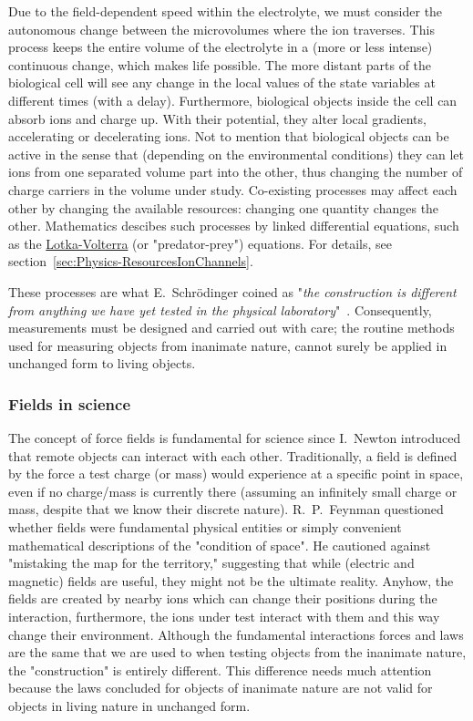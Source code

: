 Due to the 
field-dependent speed within the electrolyte, we must consider the autonomous
change between the microvolumes where the ion traverses. 
This process keeps the entire volume of the electrolyte in a (more or less intense) continuous change, which makes life possible.
The more distant parts of the biological cell will see any change in the local values of the state variables at different times (with a delay). 
Furthermore, biological objects inside the cell
can absorb ions and charge up. With their potential, they alter local gradients, accelerating or decelerating ions.  
Not to mention that biological objects can be active in the sense that 
(depending on the environmental conditions) they can let ions from one separated volume part into the other, thus changing the number of 
charge carriers in the volume under study.
Co-existing processes may affect each other by \hypertarget{ChangingResources}{changing the available resources}:
changing one quantity changes the other.
Mathematics descibes such processes by linked differential equations, such as the \href{https://en.wikipedia.org/wiki/Lotka-Volterra_equations}{Lotka-Volterra} (or \hypertarget{predator_prey}{"predator-prey"}) equations.
For details, see section~\ref{sec:Physics-ResourcesIonChannels}.


These processes are what E.~Schrödinger coined as "\textit{the construction is different from anything we have yet tested in the physical laboratory}"~\cite{Schrodinger:1992}. Consequently, measurements must be designed and carried out with care; the routine
methods used for measuring objects from inanimate nature,
cannot surely be applied in unchanged form to living objects.  

\subsubsection[Fields]{Fields in science\label{sec:Physics-Fields}}

The concept of force fields is fundamental for science
since I.~Newton introduced that remote objects can interact with each other. Traditionally, a field is defined by the force a test charge (or mass) would experience at a specific point in space, even if no charge/mass is currently there (assuming an infinitely small charge or mass, despite that we know their discrete nature).
R.~P.~Feynman questioned whether fields were fundamental physical entities or simply convenient mathematical descriptions of the "condition of space".
He cautioned against "mistaking the map for the territory," suggesting that while (electric and magnetic) fields are useful, they might not be the ultimate reality.
Anyhow, the fields are created by nearby ions which 
can change their positions during the interaction,
furthermore, the ions under test interact with them
and this way change their environment.
Although the fundamental interactions forces and laws
are the same that we are used to when testing objects
from the inanimate nature,
the "construction" is entirely different.
This difference needs much attention because 
the laws concluded for objects of inanimate nature
are not valid for objects in living nature in unchanged form.

